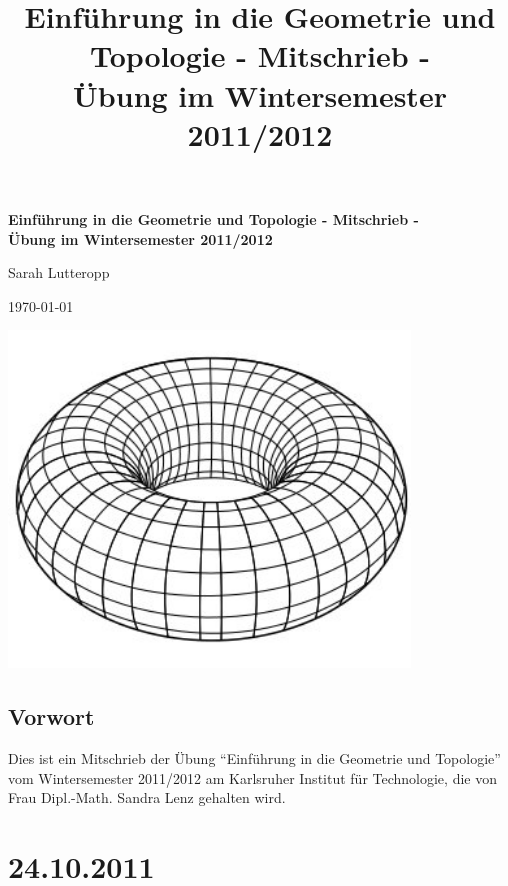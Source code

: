 \documentclass[a4paper,11pt,notitlepage]{report}
\title{\textbf{{Einführung in die Geometrie und Topologie - Mitschrieb -} \\[5ex] 
    {\Large Übung im Wintersemester 2011/2012\\[5ex]}}}
\author{\myname{Sarah Lutteropp}}
\begin{document}
\begin{titlepage}
	\begin{center}	
		\LARGE \textbf{{Einführung in die Geometrie und Topologie - Mitschrieb -} \\[5ex] 
    		{\Large Übung im Wintersemester 2011/2012\\[5ex]}}
	\end{center}
	\begin{center}
		\Large Sarah Lutteropp
	\end{center}
	\begin{center}
		\today
	\end{center}
	\vspace{2cm}
	\begin{center}
		\includegraphics[width=0.8\textwidth]{Simple_Torus.jpg}
	\end{center}
\end{titlepage}
\setcounter{tocdepth}{1}
\tableofcontents

\section*{Vorwort}
Dies ist ein Mitschrieb der Übung “Einführung in die Geometrie und Topologie” vom Wintersemester 2011/2012 am Karlsruher Institut für Technologie, die von Frau Dipl.-Math. Sandra Lenz gehalten wird.

\chapter{24.10.2011}
\end{document}

